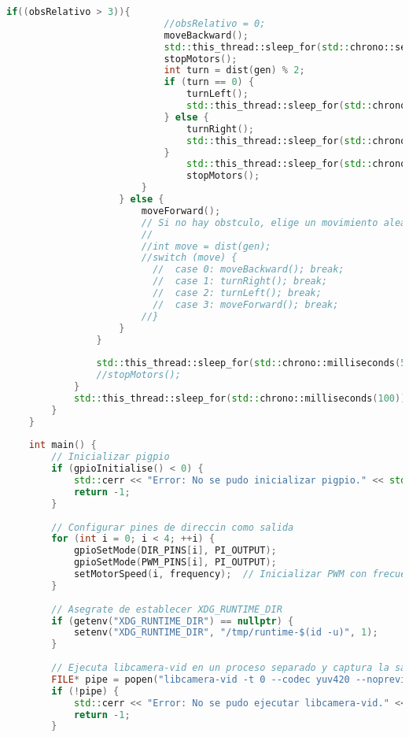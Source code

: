 \begin{lstlisting}[language={C++}, caption={Primer ajuste de c\'odigo}, label={PrimerAjuste}]
                        if((obsRelativo > 3)){
                            //obsRelativo = 0;
                            moveBackward();
                            std::this_thread::sleep_for(std::chrono::seconds(3));
                            stopMotors();
                            int turn = dist(gen) % 2;
                            if (turn == 0) {
                                turnLeft();
                                std::this_thread::sleep_for(std::chrono::seconds(5));
                            } else {
                                turnRight();
                                std::this_thread::sleep_for(std::chrono::seconds(5));
                            }
                                std::this_thread::sleep_for(std::chrono::seconds(2));
                                stopMotors();
                        }
                    } else {
                        moveForward();
                        // Si no hay obstculo, elige un movimiento aleatorio
                        //
                        //int move = dist(gen);
                        //switch (move) {
                          //  case 0: moveBackward(); break;
                          //  case 1: turnRight(); break;
                          //  case 2: turnLeft(); break;
                          //  case 3: moveForward(); break;
                        //}
                    }
                }
                
                std::this_thread::sleep_for(std::chrono::milliseconds(500));
                //stopMotors();
            }
            std::this_thread::sleep_for(std::chrono::milliseconds(100));
        }
    }
    
    int main() {
        // Inicializar pigpio
        if (gpioInitialise() < 0) {
            std::cerr << "Error: No se pudo inicializar pigpio." << std::endl;
            return -1;
        }
    
        // Configurar pines de direccin como salida
        for (int i = 0; i < 4; ++i) {
            gpioSetMode(DIR_PINS[i], PI_OUTPUT);
            gpioSetMode(PWM_PINS[i], PI_OUTPUT);
            setMotorSpeed(i, frequency);  // Inicializar PWM con frecuencia inicial
        }
    
        // Asegrate de establecer XDG_RUNTIME_DIR
        if (getenv("XDG_RUNTIME_DIR") == nullptr) {
            setenv("XDG_RUNTIME_DIR", "/tmp/runtime-$(id -u)", 1);
        }
    
        // Ejecuta libcamera-vid en un proceso separado y captura la salida en YUV, sin previsualizacn
        FILE* pipe = popen("libcamera-vid -t 0 --codec yuv420 --nopreview -o -", "r");
        if (!pipe) {
            std::cerr << "Error: No se pudo ejecutar libcamera-vid." << std::endl;
            return -1;
        }
    

\end{lstlisting}
